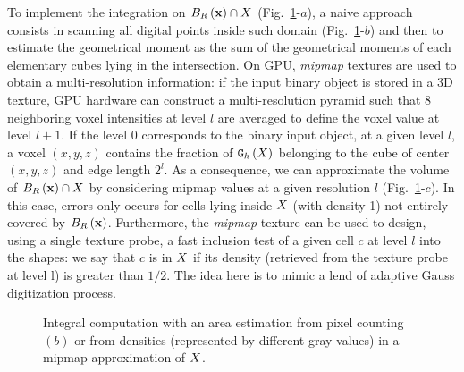 \documentclass{llncs}
\begin{document}
To implement the integration on $B_{R}\left(\mathbf{x}\right) \cap X$
(Fig.~\ref{fig:approx}-$a$), a naive approach consists in scanning all digital
points inside such domain (Fig.~\ref{fig:approx}-$b$) and then to estimate the
geometrical moment as the sum of the geometrical moments of each elementary
cubes lying in the intersection. On GPU, \emph{mipmap} textures are used to
obtain a multi-resolution information: if the input binary object is stored in a
3D texture, GPU hardware can construct a multi-resolution pyramid such that 8
neighboring voxel intensities at level $l$ are averaged to define the voxel
value at level $l+1$. If the level 0 corresponds to the binary input object, at
a given level $l$, a voxel $(x,y,z)$ contains the fraction of $\mathtt{G}_{h}\left(X\right)$ belonging
to the cube of center $(x,y,z)$ and edge length $2^l$. As a consequence, we can
approximate the volume of $B_{R}\left(\mathbf{x}\right)\cap X$ by considering mipmap values
at a given resolution $l$ (Fig.~\ref{fig:approx}-$c$). In this case, errors only
occurs for cells lying inside $X$ (with density 1) not entirely covered by
$B_{R}\left(\mathbf{x}\right)$. Furthermore, the \emph{mipmap} texture can be used to design,
using a single texture probe, a fast inclusion test of a given cell $c$ at level
$l$ into the shapes: we say that $c$ is in $X$ if its density (retrieved
from the texture probe at level l) is greater than $1/2$. The idea here is to
mimic a lend of adaptive Gauss digitization process.

\begin{figure}
  \begin{center}
  \end{center}
  \caption{Integral computation with an area estimation from pixel
    counting $(b)$ or from densities (represented by different
    gray values) in a mipmap approximation of $X$.}
  \label{fig:approx}
\end{figure}
\end{document}
